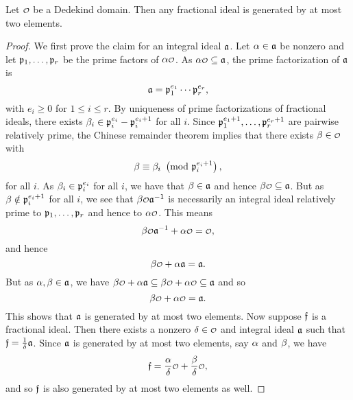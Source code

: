     \begin{proposition}\label{prop:fractional_ideal_generated_by_two_elements}
      Let $\smc{O}$ be a Dedekind domain. Then any fractional ideal is generated by at most two elements.
    \end{proposition}
    \begin{proof}
      We first prove the claim for an integral ideal $\mathfrak{a}$. Let $\alpha \in \mathfrak{a}$ be nonzero and let $\mathfrak{p}_{1},\ldots,\mathfrak{p}_{r}$ be the prime factors of $\a\smc{O}$. As $\a\smc{O} \subseteq \mf{a}$, the prime factorization of $\mathfrak{a}$ is
      \[
        \mathfrak{a} = \mathfrak{p}_{1}^{e_{1}} \cdots \mathfrak{p}_{r}^{e_{r}},
      \]
      with $e_{i} \ge 0$ for $1 \le i \le r$. By uniqueness of prime factorizations of fractional ideals, there exists $\beta_{i} \in \mathfrak{p}_{i}^{e_{i}}-\mathfrak{p}_{i}^{e_{i}+1}$ for all $i$. Since $\mathfrak{p}_{1}^{e_{1}+1},\ldots,\mathfrak{p}_{r}^{e_{r}+1}$ are pairwise relatively prime, the Chinese remainder theorem implies that there exists $\b \in \smc{O}$ with 
      \[
        \beta \equiv \beta_{i} \ \left(\text{mod }\mathfrak{p}_{i}^{e_{i}+1}\right),
      \]
      for all $i$. As $\beta_{i} \in \mathfrak{p}_{i}^{e_{i}}$ for all $i$, we have that $\beta \in \mathfrak{a}$ and hence $\b\smc{O} \subseteq \mf{a}$. But as $\beta \notin \mathfrak{p}_{i}^{e_{i}+1}$ for all $i$, we see that $\b\smc{O}\mf{a}^{-1}$ is necessarily an integral ideal relatively prime to $\mathfrak{p}_{1},\ldots,\mathfrak{p}_{r}$ and hence to $\a\smc{O}$. This means
      \[
        \b\smc{O}\mf{a}^{-1}+\a\smc{O} = \smc{O},
      \]
      and hence
      \[
        \b\smc{O}+\a\mf{a} = \mf{a}.
      \]
      But as $\alpha,\beta \in \mathfrak{a}$, we have $\b\smc{O}+\a\mf{a} \subseteq \b\smc{O}+\a\smc{O} \subseteq \mf{a}$ and so
      \[
        \b\smc{O}+\a\smc{O} = \mf{a}.
      \]
      This shows that $\mathfrak{a}$ is generated by at most two elements. Now suppose $\mathfrak{f}$ is a fractional ideal. Then there exists a nonzero $\d \in \smc{O}$ and integral ideal $\mathfrak{a}$ such that $\mathfrak{f} = \frac{1}{\delta}\mathfrak{a}$. Since $\mathfrak{a}$ is generated by at most two elements, say $\alpha$ and $\beta$, we have
      \[
        \mf{f} = \frac{\a}{\d}\smc{O}+\frac{\b}{\d}\smc{O},
      \]
      and so $\mathfrak{f}$ is also generated by at most two elements as well.
    \end{proof}

